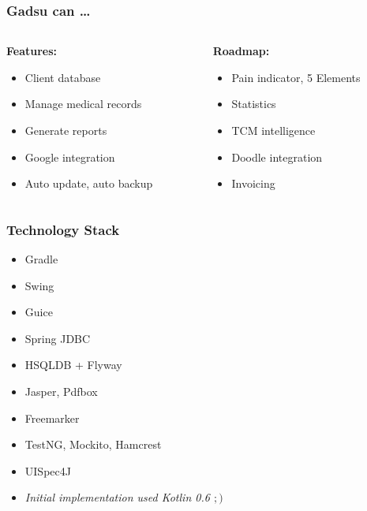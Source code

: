 \begin{frame}[t]
\frametitle{Gadsu can \ldots}
\begin{columns}[t]
\begin{column}{0.5\textwidth}
	\textbf{Features:}
	\begin{itemize}
		\item Client database
		\item Manage medical records
		\item Generate reports
		\item Google integration
		\item Auto update, auto backup
	\end{itemize}
\end{column}
\begin{column}{0.5\textwidth} 
	\textbf{Roadmap:}
	\begin{itemize}
		\item Pain indicator, 5 Elements
		\item Statistics
		\item TCM intelligence
		\item Doodle integration
		\item Invoicing
	\end{itemize}
\end{column}
\end{columns}
\end{frame}

\begin{frame}
\frametitle{Technology Stack}
\begin{itemize}
	\item Gradle
	\item Swing
	\item Guice
	\item Spring JDBC
	\item HSQLDB + Flyway
	\item Jasper, Pdfbox
	\item Freemarker
	\item TestNG, Mockito, Hamcrest
	\item UISpec4J
	\item \textit{Initial implementation used Kotlin 0.6 $;)$}
\end{itemize}
\end{frame}





